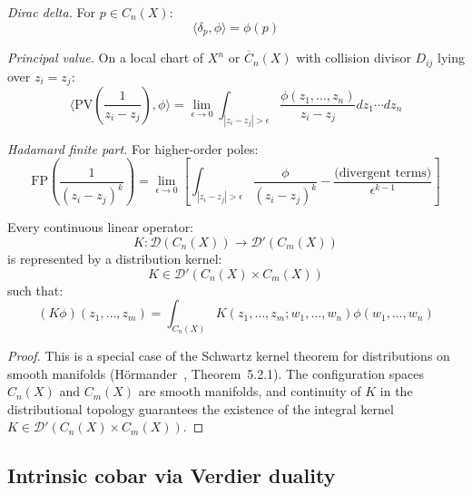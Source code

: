 \begin{example}\label{ex:fundamental-distributions}
\emph{Dirac delta.} For $p \in C_n(X)$:
\[\langle \delta_p, \phi \rangle = \phi(p)\]

\emph{Principal value.} On a local chart of $X^n$ or
$\overline{C}_n(X)$ with collision divisor $D_{ij}$ lying over
$z_i=z_j$:
\[\langle \text{PV}\left(\frac{1}{z_i - z_j}\right), \phi \rangle =
\lim_{\epsilon \to 0} \int_{|z_i - z_j| > \epsilon} \frac{\phi(z_1, \ldots, z_n)}{z_i - z_j}
dz_1 \cdots dz_n\]

\emph{Hadamard finite part.} For higher-order poles:
\[\text{FP}\left(\frac{1}{(z_i - z_j)^k}\right) =
\lim_{\epsilon \to 0} \left[\int_{|z_i - z_j| > \epsilon} \frac{\phi}{(z_i - z_j)^k} -
\frac{\text{(divergent terms)}}{\epsilon^{k-1}}\right]\]
\end{example}

\begin{theorem}\label{thm:schwartz-kernel-cobar}
Every continuous linear operator:
\[K: \mathcal{D}(C_n(X)) \to \mathcal{D}'(C_m(X))\]
is represented by a distribution kernel:
\[K \in \mathcal{D}'(C_n(X) \times C_m(X))\]
such that:
\[(K\phi)(z_1, \ldots, z_m) = \int_{C_n(X)} K(z_1, \ldots, z_m; w_1, \ldots, w_n) \phi(w_1, \ldots, w_n)\]
\end{theorem}

\begin{proof}
This is a special case of the Schwartz kernel theorem for distributions on smooth manifolds (H\"ormander~\cite{Hormander}, Theorem~5.2.1). The configuration spaces $C_n(X)$ and $C_m(X)$ are smooth manifolds, and continuity of $K$ in the distributional topology guarantees the existence of the integral kernel $K \in \mathcal{D}'(C_n(X) \times C_m(X))$.
\end{proof}

\subsection{Intrinsic cobar via Verdier duality}\label{subsec:intrinsic-cobar}

